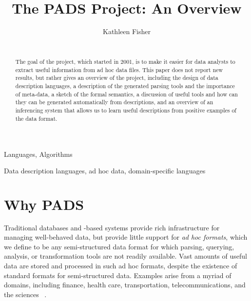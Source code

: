 \documentclass{sig-alternate}
\begin{document}
\title{The PADS Project: An Overview}
\author{
\alignauthor
Kathleen Fisher\\
  \\
  }




\maketitle{}

\begin{abstract}  
  The goal of the \pads{} project, which started in 2001, is to make
  it easier for data analysts to extract useful information from ad
  hoc data files.  This paper does not report new results, but rather
  gives an overview of the project, including the design of \pads{}
  data description languages, a description of the generated parsing
  tools and the importance of meta-data, a sketch of the formal
  semantics, a discussion of useful tools and how can they can be
  generated automatically from \pads{} descriptions, and an overview
  of an inferencing system that allows us to learn useful \pads{}
  descriptions from positive examples of the data format.
\end{abstract}


\terms
Languages, Algorithms

\keywords
Data description languages, ad hoc data,  domain-specific languages


\section {Why PADS}
\label{sec:intro}

Traditional databases and \xml{}-based systems provide rich
infrastructure for managing well-behaved data, but provide little
support for \textit{ad hoc formats}, which we define to be any
semi-structured data format for which parsing, querying, analysis, or
transformation tools are not readily available.  Vast amounts of
useful data are stored and processed in such ad hoc formats, despite
the existence of standard formats for semi-structured data.  Examples
arise from a myriad of domains, including finance, health care,
transportation, telecommunications, and the sciences ~\cite{fisher+:pads}. 
\end{document}

